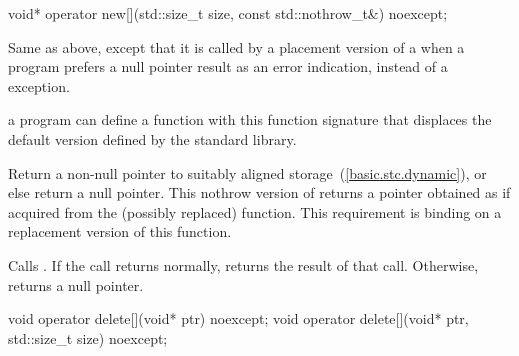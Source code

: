 %
\begin{itemdecl}
void* operator new[](std::size_t size, const std::nothrow_t&) noexcept;
\end{itemdecl}

\begin{itemdescr}
\pnum
\effects
Same as above, except that it is called by a placement version of a
when a \Cpp program prefers a null pointer result as an error indication,
instead of a
exception.

\pnum
\replaceable
a \Cpp program can define a
function with this function signature that displaces the default version
defined by the \Cpp standard library.

\pnum
\required
Return a non-null pointer to suitably aligned storage~(\ref{basic.stc.dynamic}),
or else return a null pointer.
This nothrow version of  returns a pointer obtained as if
acquired from the (possibly replaced)  function.
This requirement is binding on a replacement version of this function.

\pnum
{}
Calls . If the call returns normally,
returns the result of that call. Otherwise, returns a null pointer.
\end{itemdescr}

%
\begin{itemdecl}
void operator delete[](void* ptr) noexcept;
void operator delete[](void* ptr, std::size_t size) noexcept;
\end{itemdecl}

